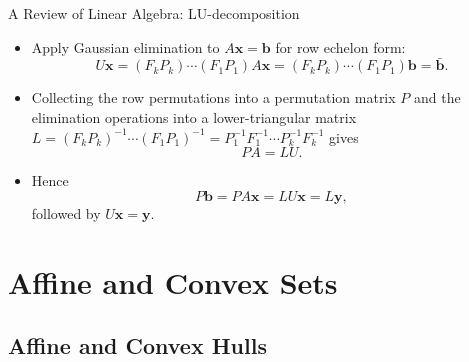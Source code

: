 \documentclass[aspectratio=169,hyperref,UTF8,CJK]{beamer}
\newcommand{\vect}[1]{\boldsymbol{#1}}
\begin{document}
\begin{frame}{A Review of Linear Algebra: LU-decomposition}
  \small
  \begin{itemize}
    \item Apply Gaussian elimination to $A\vect{x}=\vect{b}$ for row echelon form:
      \begin{equation*}
        U\vect{x}=(F_kP_k)\cdots(F_1P_1)A\vect{x}
        =(F_kP_k)\cdots(F_1P_1)\vect{b}=\bar{\vect{b}}.
      \end{equation*}
    \item Collecting the row permutations into a permutation matrix $P$ and the elimination operations into a lower-triangular matrix $L=(F_kP_k)^{-1}\cdots(F_1P_1)^{-1}=P_1^{-1}F_1^{-1}\cdots P_k^{-1}F_{k}^{-1}$ gives
      \begin{equation*}
        PA=LU.
      \end{equation*}
    \item Hence
      \begin{equation*}
        P\vect{b}=PA\vect{x}=LU\vect{x}=L\vect{y},
      \end{equation*}
      followed by $U\vect{x}=\vect{y}$.
  \end{itemize}
\end{frame}

\section{Affine and Convex Sets}
\subsection{Affine and Convex Hulls}
\end{document}
